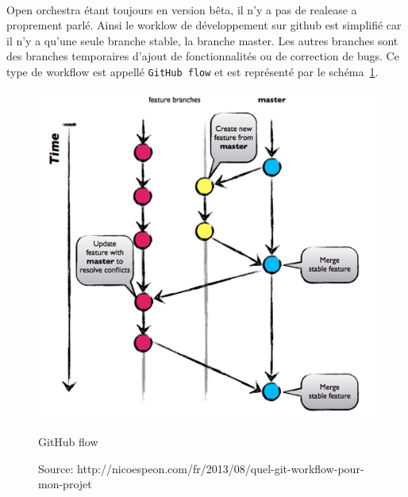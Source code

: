 \paragraph{}
Open orchestra étant toujours en version bêta, il n'y a pas de realease a proprement parlé. Ainsi le worklow de développement sur github est simplifié car il n'y a qu'une seule branche stable, la branche master. Les autres branches sont des branches temporaires d'ajout de fonctionnalités ou de correction de bugs. Ce type de workflow est appellé \verb?GitHub flow? et est représenté par le schéma~\ref{github}.
\begin{figure}[H]
  \begin{center}
    \includegraphics[scale=0.75]{images/github-flow}
  \end{center}
  \caption{GitHub flow}
  \caption*{Source: http://nicoespeon.com/fr/2013/08/quel-git-workflow-pour-mon-projet}
  \label{github}
\end{figure}

